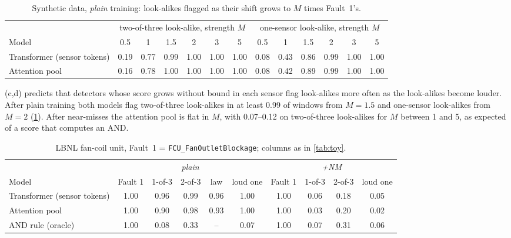 \begin{table}[h]\centering\small\setlength{\tabcolsep}{3pt}
\renewcommand{\arraystretch}{1.15}
\caption{Synthetic data, \emph{plain} training: look-alikes flagged as their shift grows to $M$ times Fault~1's.}\label{tab:strength}
\begin{tabular}{@{}lcccccc|cccccc@{}}\toprule
 & \multicolumn{6}{c|}{two-of-three look-alike, strength $M$} & \multicolumn{6}{c}{one-sensor look-alike, strength $M$}\\
Model & 0.5 & 1 & 1.5 & 2 & 3 & 5 & 0.5 & 1 & 1.5 & 2 & 3 & 5\\\midrule
Transformer (sensor tokens) & 0.19 & 0.77 & 0.99 & 1.00 & 1.00 & 1.00 & 0.08 & 0.43 & 0.86 & 0.99 & 1.00 & 1.00\\
Attention pool & 0.16 & 0.78 & 1.00 & 1.00 & 1.00 & 1.00 & 0.08 & 0.42 & 0.89 & 0.99 & 1.00 & 1.00\\
\bottomrule\end{tabular}\end{table}

(c,d) predicts that detectors whose score grows without bound in each sensor flag look-alikes more often as the look-alikes become louder. After plain training both models flag two-of-three look-alikes in at least 0.99 of windows from $M=1.5$ and one-sensor look-alikes from $M=2$ (\cref{tab:strength}). After near-misses the attention pool is flat in $M$, with 0.07--0.12 on two-of-three look-alikes for $M$ between 1 and 5, as expected of a score that computes an AND.

\begin{table}[h]\centering\small\setlength{\tabcolsep}{3.5pt}
\renewcommand{\arraystretch}{1.15}
\caption{LBNL fan-coil unit, Fault~1 = \texttt{FCU\_FanOutletBlockage}; columns as in \cref{tab:toy}.}\label{tab:fcu}
\begin{tabular}{@{}lccccc|cccc@{}}\toprule
 & \multicolumn{5}{c|}{\emph{plain}} & \multicolumn{4}{c}{\emph{+NM}}\\
Model & Fault 1 & 1-of-3 & 2-of-3 & law & loud one & Fault 1 & 1-of-3 & 2-of-3 & loud one\\\midrule
Transformer (sensor tokens) & 1.00 & 0.96 & 0.99 & 0.96 & 1.00 & 1.00 & 0.06 & 0.18 & 0.05\\
Attention pool & 1.00 & 0.90 & 0.98 & 0.93 & 1.00 & 1.00 & 0.03 & 0.20 & 0.02\\
\midrule
AND rule (oracle) & 1.00 & 0.08 & 0.33 & -- & 0.07 & 1.00 & 0.07 & 0.31 & 0.06\\
\bottomrule\end{tabular}\end{table}

